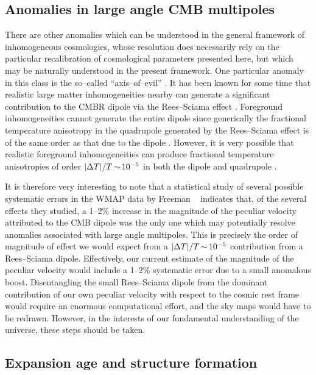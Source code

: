 \documentclass[12pt]{article}
\begin{document}
\subsection{Anomalies in large angle CMB multipoles\label{pole}}

There are other anomalies which can be understood in the general framework
of inhomogeneous cosmologies, whose resolution does necessarily rely on
the particular recalibration of cosmological parameters presented here,
but which may be naturally understood in the present framework. One
particular anomaly in this class is the so--called ``axis--of--evil''
\cite{axis}.
It has been known for some time that realistic large matter inhomogeneities
nearby can generate a significant contribution to the CMBR dipole via the
Rees--Sciama effect \cite{RS}. Foreground inhomogeneities cannot generate
the entire dipole since generically the fractional temperature anisotropy in
the quadrupole generated by the Rees--Sciama effect is of the same order
as that due to the dipole \cite{MM}. However, it is
very possible that realistic foreground inhomogeneities can produce
fractional temperature anisotropies of order $|\Delta T|/T\mathop{\sim}\limits10^{-5}$
in both the dipole and quadrupole \cite{RRS}.

It is therefore very interesting to note that a statistical
study of several possible systematic errors in the WMAP data by Freeman
\etal\ \cite{Freeman} indicates that, of the several effects they studied,
a 1--2\% increase in the magnitude of the peculiar velocity attributed
to the CMB dipole was the only one which may potentially resolve anomalies
associated with large angle multipoles. This is precisely the order of
magnitude of effect we would expect from a $|\Delta T|/T\mathop{\sim}\limits10^{-5}$
contribution from a Rees--Sciama dipole. Effectively, our current estimate
of the magnitude of the peculiar velocity would include a 1--2\% systematic
error due to a small anomalous boost. Disentangling the small Rees--Sciama
dipole from the dominant contribution of our own peculiar velocity with
respect to the cosmic rest frame would require an enormous computational
effort, and the sky maps would have to be redrawn. However, in the interests
of our fundamental understanding of the universe, these steps should be taken.

\subsection{Expansion age and structure formation\label{age}}
\end{document}
